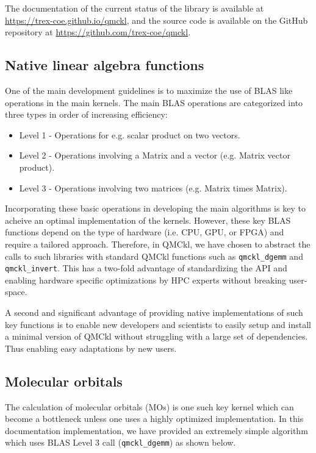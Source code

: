 The documentation of the current status of the library is available
at \url{https://trex-coe.github.io/qmckl}, and the source code is
available on the GitHub repository at \url{https://github.com/trex-coe/qmckl}.

\subsection{Native linear algebra functions}

One of the main development guidelines is to maximize the use
of \ac{BLAS} like operations in the main kernels. The main \ac{BLAS} operations are
categorized into three types in order of increasing efficiency:

\begin{itemize}
\item Level 1 - Operations for e.g. scalar product on two vectors.
\item Level 2 - Operations involving a Matrix and a vector (e.g. Matrix vector product).
\item Level 3 - Operations involving two matrices (e.g. Matrix times Matrix).
\end{itemize}

Incorporating these basic operations in developing the main algorithms is key to
acheive an optimal implementation of the kernels. However, these key BLAS
functions depend on the type of hardware (i.e. CPU, GPU, or FPGA) and require a
tailored approach. Therefore, in \ac{QMCkl}, we have chosen to abstract the
calls to such libraries with standard \ac{QMCkl} functions such as
\texttt{qmckl_dgemm} and \texttt{qmckl_invert}. This has a
two-fold advantage of standardizing the API and enabling hardware specific
optimizations by HPC experts without breaking user-space.

A second and significant advantage of providing native implementations of
such key functions is to enable new developers and scientists to easily
setup and install a minimal version of \ac{QMCkl} without struggling with
a large set of dependencies. Thus enabling easy adaptations by new users.

\subsection{Molecular orbitals}

The calculation of molecular orbitals (MOs) is one such key kernel which can
become a bottleneck unless one uses a highly optimized implementation.
In this documentation implementation, we have provided an extremely simple
algorithm which uses \ac{BLAS} Level 3 call (\texttt{qmckl_dgemm})
as shown below.

